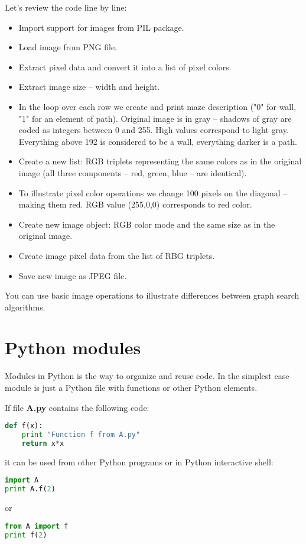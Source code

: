 Let's review the code line by line:
\begin{itemize}
\item Import support for images from PIL package.
\item Load image from PNG file. 
\item Extract pixel data and convert it into a list of pixel colors.
\item Extract image size -- width and height.
\item In the loop over each row we create and print maze description 
("0" for wall, "1" for an element of path). Original image is
in gray -- shadows of gray are coded as integers between 0 and 255.
High values correspond to light gray. Everything above 192 is considered
to be a wall, everything darker is a path.
\item Create a new list: RGB triplets representing the same colors
as in the original image (all three components -- red, green, blue --
are identical).
\item To illustrate pixel color operations we change 100 pixels on the 
diagonal -- making them red. RGB value (255,0,0) corresponds to red color.
\item Create new image object: RGB color mode and the same size as in
the original image.
\item Create image pixel data from the list of RBG triplets.
\item Save new image as JPEG file.
\end{itemize}

You can use basic image operations to illustrate differences 
between graph search algorithms.

\section{Python modules}

Modules in Python is the way to organize and reuse code.
In the simplest case module is just a Python file with
functions or other Python elements.

If file \textbf{A.py} contains the following code:

\begin{lstlisting}[language=Python,style=codelst2,caption={Python: one-file module}]
def f(x):
    print "Function f from A.py"
    return x*x
\end{lstlisting}
it can be used from other Python programs or in Python interactive 
shell:

\begin{lstlisting}[language=Python,style=codelst2,caption={Python: accessing single-file module function - 1}]
import A
print A.f(2)
\end{lstlisting}
or
\begin{lstlisting}[language=Python,style=codelst2,caption={Python: accessing single-file module function - 2}]
from A import f
print f(2)
\end{lstlisting}

